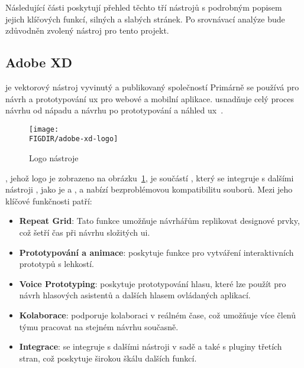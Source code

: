 Následující části poskytují přehled těchto tří nástrojů s podrobným popisem jejich klíčových funkcí, silných a slabých stránek.
Po srovnávací analýze bude zdůvodněn zvolený nástroj pro tento projekt.

\subsection{Adobe XD}
\label{subsec:navrh-ui-nastroje-adobe-xd}
 je vektorový nástroj vyvinutý a publikovaný společností 
Primárně se používá pro návrh a prototypování \ac{ux} pro webové a mobilní aplikace.
 usnadňuje celý proces návrhu od nápadu a návrhu po prototypování a náhled \ac{ux}~\cite{adobe-xd}.

\begin{figure}[H]
    \centering
    \texttt{[image: \\FIGDIR/adobe-xd-logo]}
    \caption{Logo nástroje \cite{adobe-xd}}
    \label{fig:adobe-xd-logo}
\end{figure}

, jehož logo je zobrazeno na obrázku~\ref{fig:adobe-xd-logo}, je součástí , který se integruje s dalšími nástroji , jako je  a , a nabízí bezproblémovou kompatibilitu souborů.
Mezi jeho klíčové funkčnosti patří:
\begin{itemize}
    \item \textbf{Repeat Grid}: Tato funkce umožňuje návrhářům replikovat designové prvky, což šetří čas při návrhu složitých \ac{ui}.
    \item \textbf{Prototypování a animace}:  poskytuje funkce pro vytváření interaktivních prototypů s lehkostí.
    \item \textbf{Voice Prototyping}:  poskytuje prototypování hlasu, které lze použít pro návrh hlasových asistentů a dalších hlasem ovládaných aplikací.
    \item \textbf{Kolaborace}:  podporuje kolaboraci v reálném čase, což umožňuje více členů týmu pracovat na stejném návrhu současně.
    \item \textbf{Integrace}:  se integruje s dalšími nástroji v sadě  a také s pluginy třetích stran, což poskytuje širokou škálu dalších funkcí.
\end{itemize}

